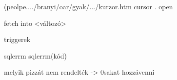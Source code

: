 (peolpe..../branyi/oar/gyak/.../kurzor.htm
cursor . open


fetch into <változó>

triggerek

sqlerrm
sqlerrm(kód)


melyik pizzát nem rendelték -> 0sakat hozzávenni
